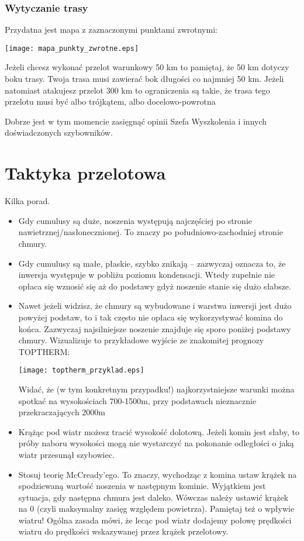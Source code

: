 \documentclass{article}
\begin{document}
\subsubsection{Wytyczanie trasy}
Przydatna jest mapa z zaznaczonymi punktami zwrotnymi:
\begin{center}
\texttt{[image: mapa\_punkty\_zwrotne.eps]}
\end{center}
Jeżeli chcesz wykonać przelot warunkowy 50 km to pamiętaj, że 50 km dotyczy
boku trasy. Twoja trasa musi zawierać bok długości co najmniej 50 km.
Jeżeli natomiast atakujesz przelot 300 km to ograniczenia są takie, że
trasa tego przelotu musi być albo trójkątem, albo docelowo-powrotna

Dobrze jest w tym momencie zasięgnąć opinii Szefa Wyszkolenia i innych
doświadczonych szybowników.

\newpage

\section{Taktyka przelotowa}
Kilka porad.
\begin{itemize}
\item Gdy cumulusy są duże, noszenia występują najczęściej po stronie
    nawietrznej/nasłonecznionej. To znaczy po
    południowo-zachodniej stronie chmury.
\item Gdy cumulusy są małe, płaskie, szybko znikają -- zazwyczaj oznacza
    to, że inwersja występuje w pobliżu poziomu kondensacji. Wtedy zupełnie
    nie opłaca się wznosić się aż do podstawy gdyż noszenie stanie się
    dużo słabsze.
\item Nawet jeżeli widzisz, że chmury są wybudowane i warstwa inwersji jest
    dużo powyżej podstaw, to i tak często nie opłaca się wykorzystywać komina
    do końca. Zazwyczaj najsilniejsze noszenie znajduje się sporo poniżej
    podstawy chmury. Wizualizuje to przykładowe wyjście ze znakomitej
    prognozy TOPTHERM:
    \begin{center}
    \texttt{[image: toptherm\_przyklad.eps]}
    \end{center}
    \noindent
    Widać, że (w tym konkretnym przypadku!) najkorzystniejsze warunki
    można spotkać na wysokościach 700-1500m, przy podstawach
    nieznacznie przekraczających 2000m
\item Krążąc pod wiatr możesz tracić wysokość dolotową. Jeżeli komin jest
    słaby, to próby naboru wysokości mogą nie wystarczyć na pokonanie
    odległości o jaką wiatr przesunął szybowiec. 
\item Stosuj teorię McCready'ego. To znaczy, wychodząc z komina ustaw krążek
    na spodziewaną wartość noszenia w następnym kominie. Wyjątkiem jest
    sytuacja, gdy następna chmura jest daleko. Wówczas należy ustawić
    krążek na 0 (czyli maksymalny zasięg względem powietrza).
    Pamiętaj też o wpływie wiatru!
    Ogólna zasada mówi, że lecąc pod wiatr dodajemy połowę prędkości
    wiatru do prędkości wskazywanej przez krążek przelotowy.

\end{itemize}
\newpage
\end{document}
